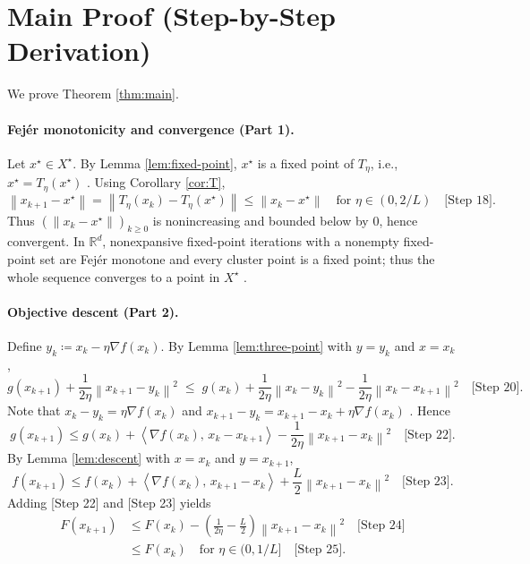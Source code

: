 \documentclass[11pt]{article}
\newcommand{\R}{\mathbb{R}}
\newcommand{\inner}[2]{\left\langle #1,\, #2 \right\rangle}
\newcommand{\norm}[1]{\left\lVert #1 \right\rVert}
\begin{document}
\section*{Main Proof (Step-by-Step Derivation)}
We prove Theorem \ref{thm:main}.

\paragraph{Fej\'er monotonicity and convergence (Part 1).}
Let $x^\star\in X^\star$. By Lemma \ref{lem:fixed-point}, $x^\star$ is a fixed point of $T_\eta$, i.e., $x^\star=T_\eta(x^\star)$ \quad[Step 17]. Using Corollary \ref{cor:T},
\[
\norm{x_{k+1}-x^\star} = \norm{T_\eta(x_k)-T_\eta(x^\star)} \le \norm{x_k-x^\star} \quad\text{for } \eta\in(0,2/L) \quad\text{[Step 18]}.
\]
Thus $(\norm{x_k-x^\star})_{k\ge 0}$ is nonincreasing and bounded below by $0$, hence convergent. In $\R^d$, nonexpansive fixed-point iterations with a nonempty fixed-point set are Fej\'er monotone and every cluster point is a fixed point; thus the whole sequence converges to a point in $X^\star$ \quad[Step 19].

\paragraph{Objective descent (Part 2).}
Define $y_k \coloneqq x_k - \eta \nabla f(x_k)$. By Lemma \ref{lem:three-point} with $y=y_k$ and $x=x_k$,
\[
g(x_{k+1}) + \frac{1}{2\eta}\norm{x_{k+1}-y_k}^2 \;\le\; g(x_k) + \frac{1}{2\eta}\norm{x_k-y_k}^2 - \frac{1}{2\eta}\norm{x_k-x_{k+1}}^2 \quad\text{[Step 20]}.
\]
Note that $x_k-y_k=\eta \nabla f(x_k)$ and $x_{k+1}-y_k = x_{k+1}-x_k + \eta \nabla f(x_k)$ \quad[Step 21]. Hence
\[
g(x_{k+1}) \le g(x_k) + \inner{\nabla f(x_k)}{x_k - x_{k+1}} - \frac{1}{2\eta}\norm{x_{k+1}-x_k}^2 \quad\text{[Step 22]}.
\]
By Lemma \ref{lem:descent} with $x=x_k$ and $y=x_{k+1}$,
\[
f(x_{k+1}) \le f(x_k) + \inner{\nabla f(x_k)}{x_{k+1}-x_k} + \frac{L}{2}\norm{x_{k+1}-x_k}^2 \quad\text{[Step 23]}.
\]
Adding [Step 22] and [Step 23] yields
\begin{align*}
F(x_{k+1})
&\le F(x_k) - \left(\frac{1}{2\eta}-\frac{L}{2}\right)\norm{x_{k+1}-x_k}^2 \quad\text{[Step 24]}\\
&\le F(x_k) \quad\text{for }\eta\in(0,1/L] \quad\text{[Step 25]}.
\end{align*}
\end{document}

